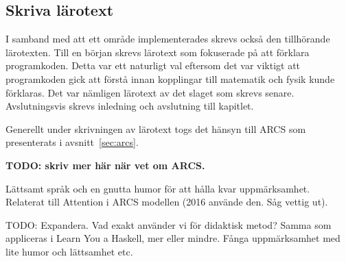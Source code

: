 \begin{draft}

\subsection{Skriva lärotext}

I samband med att ett område implementerades skrevs också den tillhörande
lärotexten. Till en början skrevs lärotext som fokuserade på att förklara
programkoden. Detta var ett naturligt val eftersom det var viktigt att
programkoden gick att förstå innan kopplingar till matematik och fysik kunde
förklaras. Det var nämligen lärotext av det slaget som skrevs senare.
Avslutningsvis skrevs inledning och avslutning till kapitlet.

\end{draft}
\begin{binge}

Generellt under skrivningen av lärotext togs det hänsyn till ARCS som
presenterats i avsnitt~\ref{sec:arcs}. 

\textbf{TODO: skriv mer här när vet om ARCS.}

Lättsamt språk och en gnutta humor för att hålla kvar
uppmärksamhet. Relaterat till Attention i ARCS modellen (2016
använde den. Såg vettig ut).

TODO: Expandera. Vad exakt använder vi för didaktisk metod? Samma
som appliceras i Learn You a Haskell, mer eller mindre. Fånga
uppmärksamhet med lite humor och lättsamhet etc.

\end{binge}
